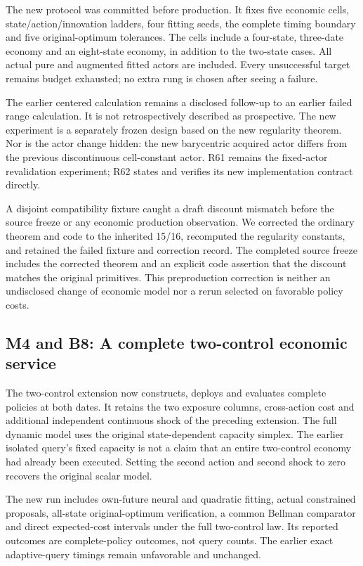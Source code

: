 \documentclass[ecta,nameyear,draft]{econsocart}
\begin{document}
The new protocol was committed before production. It fixes five economic
cells, state/action/innovation ladders, four fitting seeds, the complete
timing boundary and five original-optimum tolerances. The cells include
a four-state, three-date economy and an eight-state economy, in addition
to the two-state cases. All actual pure and augmented fitted actors are
included. Every unsuccessful target remains budget exhausted; no extra
rung is chosen after seeing a failure.

The earlier centered calculation remains a disclosed follow-up to an
earlier failed range calculation. It is not retrospectively described as
prospective. The new experiment is a separately frozen design based on
the new regularity theorem. Nor is the actor change hidden: the new
barycentric acquired actor differs from the previous discontinuous
cell-constant actor. R61 remains the fixed-actor revalidation
experiment; R62 states and verifies its new implementation contract
directly.

A disjoint compatibility fixture caught a draft discount mismatch before
the source freeze or any economic production observation. We corrected
the ordinary theorem and code to the inherited 15/16, recomputed the
regularity constants, and retained the failed fixture and correction
record. The completed source freeze includes the corrected theorem and
an explicit code assertion that the discount matches the original
primitives. This preproduction correction is neither an undisclosed
change of economic model nor a rerun selected on favorable policy costs.

\hypertarget{m4-and-b8-a-complete-two-control-economic-service}{%
\subsection{M4 and B8: A complete two-control economic
service}\label{m4-and-b8-a-complete-two-control-economic-service}}

The two-control extension now constructs, deploys and evaluates complete
policies at both dates. It retains the two exposure columns,
cross-action cost and additional independent continuous shock of the
preceding extension. The full dynamic model uses the original
state-dependent capacity simplex. The earlier isolated query's fixed
capacity is not a claim that an entire two-control economy had already
been executed. Setting the second action and second shock to zero
recovers the original scalar model.

The new run includes own-future neural and quadratic fitting, actual
constrained proposals, all-state original-optimum verification, a common
Bellman comparator and direct expected-cost intervals under the full
two-control law. Its reported outcomes are complete-policy outcomes, not
query counts. The earlier exact adaptive-query timings remain
unfavorable and unchanged.
\end{document}
